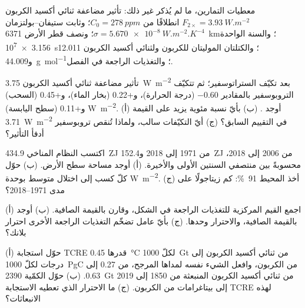 معطيات التمارين، ما لم يُذكر غير ذلك: تأثير مضاعفة ثنائي أكسيد الكربون $F_{2\times} =
\qty{3.93}{W.m^{-2}}$ انطلاقًا من $C_0 = \qty{278}{ppm}$؛ وثابت ستيفان--بولتزمان $\sigma =
\qty{5.670e-8}{W.m^{-2}.K^{-4}}$؛ ونصف قطر الأرض \qty{6371}{km}؛ والسنة الواحدة
\qty{3.156e7}{s}؛ والكتلتان الموليتان للكربون ولثنائي أكسيد الكربون 12.011 و\qty{44.009}{g.mol^{-1}}؛
والتغذيات الراجعة  في الفصل.

\begin{exercise}[$\star$]\label{exo:b2:anthropogenic-climate-change:1}
تأثير مضاعفة ثنائي أكسيد الكربون \qty{3.75}{W.m^{-2}} بعد تكيّف الستراتوسفير؛
ثم تتكيّف التروبوسفير بالمقادير $-0.60$ (درجة الحرارة)، و+0.22 (بخار الماء)، و+0.45 (السحب)
و+0.11 (سطح اليابسة) \unit{W.m^{-2}}. (أ) أوجد . (ب) بأيّ نسبة مئوية يزيد على
القيمة \qty{3.71}{W.m^{-2}} في التقييم السابق؟ (ج) أيّ التكيّفات سالب، ولماذا تُنقص تروبوسفير أدفأ
التأثير؟
\end{exercise}

\begin{exercise}[$\star$]\label{exo:b2:anthropogenic-climate-change:2}
اكتسب النظام المناخي \qty{434.9}{ZJ} من 1971 إلى 2018 و\qty{152.4}{ZJ} من 2006 إلى 2018،
محسوبةً بين منتصفي السنتين الأولى والأخيرة. (أ) أوجد مساحة سطح الأرض.
(ب) حوّل كلّ كسب إلى اختلال متوسط بوحدة \unit{W.m^{-2}}. (ج) أخذ المحيط
\qty{91}{\percent}: كم زيتاجولًا على مدى 1971--2018؟
\end{exercise}

\begin{exercise}[$\star$]\label{exo:b2:anthropogenic-climate-change:3}
(أ) اجمع القيم المركزية للتغذيات الراجعة في الشكل، وقارن بالقيمة الصافية. (ب) أوجد
 بالقيمة الصافية، والاحترار  وحدها. (ج) بأيّ عامل تضخّم
التغذيات الراجعة الأخرى احترار بلانك؟
\end{exercise}

\begin{exercise}[$\star$]\label{exo:b2:anthropogenic-climate-change:4}
(أ) حوّل استجابة TCRE قدرها \qty{0.45}{\celsius} لكلّ \qty{1000}{Gt} من ثنائي أكسيد الكربون إلى درجات لكلّ
\qty{1000}{PgC} من الكربون، وافعل الشيء نفسه لمداها المرجح، من 0.27 إلى 0.63. (ب) حوّل
الكمّية \qty{2390}{Gt} من ثنائي أكسيد الكربون المنبعثة من 1850 إلى 2019 إلى بيتاغرامات من الكربون. (ج) ما
الاحترار الذي تعطيه الاستجابة TCRE لهذه الانبعاثات؟
\end{exercise}

